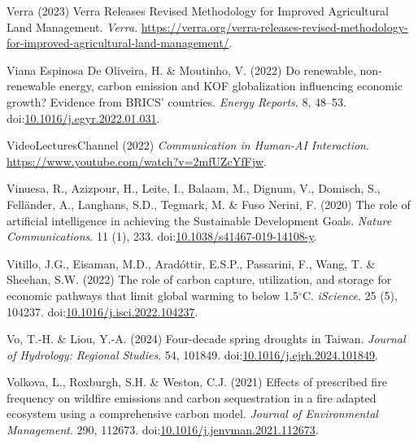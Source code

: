 \documentclass[
  letterpaper,
  DIV=11,
  numbers=noendperiod]{scrartcl}
\newlength{\cslhangindent}
\newenvironment{CSLReferences}[2] %
 {\begin{list}{}{%
  \setlength{\itemindent}{0pt}
  \setlength{\leftmargin}{0pt}
  \setlength{\parsep}{0pt}
  \ifodd #1
   \setlength{\leftmargin}{\cslhangindent}
   \setlength{\itemindent}{-1\cslhangindent}
  \fi
  \setlength{\itemsep}{#2\baselineskip}}}
 {\end{list}}
\begin{document}
\begin{CSLReferences}{0}{1}
Verra (2023) Verra {Releases Revised Methodology} for {Improved
Agricultural Land Management}. \emph{Verra}.
\url{https://verra.org/verra-releases-revised-methodology-for-improved-agricultural-land-management/}.

Viana Espinosa De Oliveira, H. \& Moutinho, V. (2022) Do renewable,
non-renewable energy, carbon emission and {KOF} globalization
influencing economic growth? {Evidence} from {BRICS}' countries.
\emph{Energy Reports}. 8, 48--53.
doi:\href{https://doi.org/10.1016/j.egyr.2022.01.031}{10.1016/j.egyr.2022.01.031}.

VideoLecturesChannel (2022) \emph{Communication in {Human-AI
Interaction}}. \url{https://www.youtube.com/watch?v=2mfUZcYfFjw}.

Vinuesa, R., Azizpour, H., Leite, I., Balaam, M., Dignum, V., Domisch,
S., Felländer, A., Langhans, S.D., Tegmark, M. \& Fuso Nerini, F. (2020)
The role of artificial intelligence in achieving the {Sustainable
Development Goals}. \emph{Nature Communications}. 11 (1), 233.
doi:\href{https://doi.org/10.1038/s41467-019-14108-y}{10.1038/s41467-019-14108-y}.

Vitillo, J.G., Eisaman, M.D., Aradóttir, E.S.P., Passarini, F., Wang, T.
\& Sheehan, S.W. (2022) The role of carbon capture, utilization, and
storage for economic pathways that limit global warming to below
1.5{\(^\circ\)}{C}. \emph{iScience}. 25 (5), 104237.
doi:\href{https://doi.org/10.1016/j.isci.2022.104237}{10.1016/j.isci.2022.104237}.

Vo, T.-H. \& Liou, Y.-A. (2024) Four-decade spring droughts in {Taiwan}.
\emph{Journal of Hydrology: Regional Studies}. 54, 101849.
doi:\href{https://doi.org/10.1016/j.ejrh.2024.101849}{10.1016/j.ejrh.2024.101849}.

Volkova, L., Roxburgh, S.H. \& Weston, C.J. (2021) Effects of prescribed
fire frequency on wildfire emissions and carbon sequestration in a fire
adapted ecosystem using a comprehensive carbon model. \emph{Journal of
Environmental Management}. 290, 112673.
doi:\href{https://doi.org/10.1016/j.jenvman.2021.112673}{10.1016/j.jenvman.2021.112673}.


\end{CSLReferences}
\end{document}
